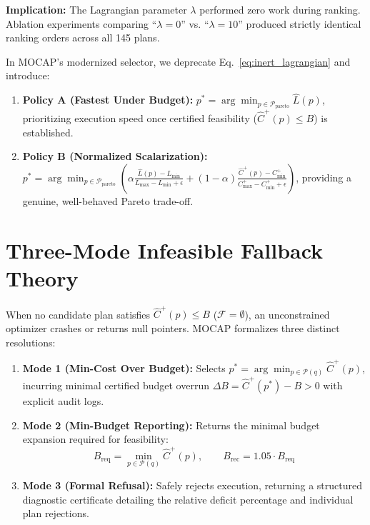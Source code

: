 \documentclass[11pt,a4paper]{article}
\begin{document}
\textbf{Implication:} The Lagrangian parameter $\lambda$ performed zero work during ranking. Ablation experiments comparing ``$\lambda = 0$'' vs. ``$\lambda = 10$'' produced strictly identical ranking orders across all 145 plans.

In MOCAP's modernized selector, we deprecate Eq.~\eqref{eq:inert_lagrangian} and introduce:
\begin{enumerate}
    \item \textbf{Policy A (Fastest Under Budget):} $p^* = \arg\min_{p \in \mathcal{P}_{\text{pareto}}} \hat{L}(p)$, prioritizing execution speed once certified feasibility ($\hat{C}^+(p) \le B$) is established.
    \item \textbf{Policy B (Normalized Scalarization):} $p^* = \arg\min_{p \in \mathcal{P}_{\text{pareto}}} \left( \alpha \frac{\hat{L}(p) - L_{\min}}{L_{\max} - L_{\min} + \epsilon} + (1-\alpha) \frac{\hat{C}^+(p) - C_{\min}^+}{C_{\max}^+ - C_{\min}^+ + \epsilon} \right)$, providing a genuine, well-behaved Pareto trade-off.
\end{enumerate}

\section{Three-Mode Infeasible Fallback Theory}

When no candidate plan satisfies $\hat{C}^+(p) \le B$ ($\mathcal{F} = \emptyset$), an unconstrained optimizer crashes or returns null pointers. MOCAP formalizes three distinct resolutions:

\begin{enumerate}
    \item \textbf{Mode 1 (Min-Cost Over Budget):} Selects $p^* = \arg\min_{p \in \mathcal{P}(q)} \hat{C}^+(p)$, incurring minimal certified budget overrun $\Delta B = \hat{C}^+(p^*) - B > 0$ with explicit audit logs.
    \item \textbf{Mode 2 (Min-Budget Reporting):} Returns the minimal budget expansion required for feasibility:
    \begin{equation}
        B_{\text{req}} = \min_{p \in \mathcal{P}(q)} \hat{C}^+(p), \qquad B_{\text{rec}} = 1.05 \cdot B_{\text{req}}
    \end{equation}
    \item \textbf{Mode 3 (Formal Refusal):} Safely rejects execution, returning a structured diagnostic certificate detailing the relative deficit percentage and individual plan rejections.
\end{enumerate}
\end{document}
